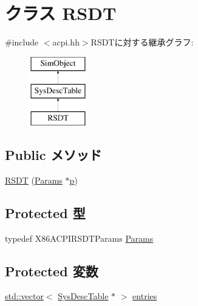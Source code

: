 \hypertarget{classX86ISA_1_1ACPI_1_1RSDT}{
\section{クラス RSDT}
\label{classX86ISA_1_1ACPI_1_1RSDT}
}


{\ttfamily \#include $<$acpi.hh$>$}RSDTに対する継承グラフ:\begin{figure}[H]
\begin{center}
\leavevmode
\includegraphics[height=3cm]{classX86ISA_1_1ACPI_1_1RSDT}
\end{center}
\end{figure}
\subsection*{Public メソッド}
\begin{DoxyCompactItemize}
\item 
\hyperlink{classX86ISA_1_1ACPI_1_1RSDT_adededd505de0d17df723f9ccaf5b4562}{RSDT} (\hyperlink{classX86ISA_1_1ACPI_1_1RSDT_a1a611568d222cb930a3203f6cceb698a}{Params} $\ast$\hyperlink{namespaceX86ISA_af675c1d542a25b96e11164b80809a856}{p})
\end{DoxyCompactItemize}
\subsection*{Protected 型}
\begin{DoxyCompactItemize}
\item 
typedef X86ACPIRSDTParams \hyperlink{classX86ISA_1_1ACPI_1_1RSDT_a1a611568d222cb930a3203f6cceb698a}{Params}
\end{DoxyCompactItemize}
\subsection*{Protected 変数}
\begin{DoxyCompactItemize}
\item 
\hyperlink{classstd_1_1vector}{std::vector}$<$ \hyperlink{classX86ISA_1_1ACPI_1_1SysDescTable}{SysDescTable} $\ast$ $>$ \hyperlink{classX86ISA_1_1ACPI_1_1RSDT_aff927a83490471e964eaa7934ab31edf}{entries}
\end{DoxyCompactItemize}


